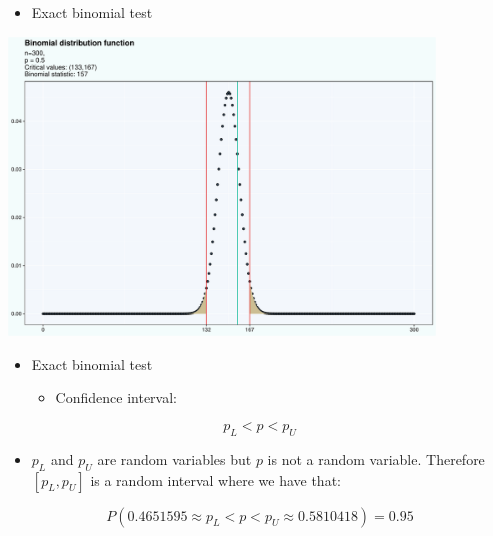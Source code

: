 \documentclass[
  ignorenonframetext,
]{beamer}
\providecommand{\tightlist}{%
  \setlength{\itemsep}{0pt}\setlength{\parskip}{0pt}}\usepackage{longtable,booktabs,array}
\begin{document}
\begin{frame}{}
\label{section-11}
\begin{itemize}
\tightlist
\item
  Exact binomial test
\end{itemize}

\begin{center}
\includegraphics[width=0.85\textwidth,height=\textheight]{006_comparing_groups_statistical_tests_files/figure-beamer/unnamed-chunk-12-1.pdf}
\end{center}
\end{frame}

\begin{frame}{}
\label{section-12}
\begin{itemize}
\item
  Exact binomial test

  \begin{itemize}
  \tightlist
  \item
    Confidence interval:
  \end{itemize}
\end{itemize}

\[p_L < p < p_U\]

\begin{itemize}
\tightlist
\item
  \(p_L\) and \(p_U\) are random variables but \(p\) is not a random
  variable. Therefore \([p_L, p_U]\) is a random interval where we have
  that:
\end{itemize}

\[P(0.4651595 \approx p_L < p < p_U \approx 0.5810418) = 0.95\]
\end{frame}
\end{document}
